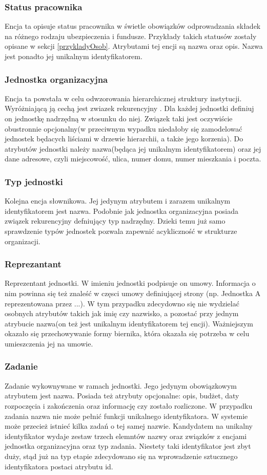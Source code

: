 \subsubsection{Status pracownika}
Encja ta opisuje status pracownika w świetle obowiązków odprowadzania składek na różnego rodzaju ubezpieczenia i fundusze. Przykłady takich statusów zostały opisane w sekcji \ref{przykladyOsob}. Atrybutami tej encji są nazwa oraz opis. Nazwa jest ponadto jej unikalnym identyfikatorem.

\subsubsection{Jednostka organizacyjna}
Encja ta powstała w celu odwzorowania hierarchicznej struktury instytucji. Wyróżniającą ją cechą jest zwiazek rekurencyjny . Dla każdej jednostki definiuj on jednostkę nadrzędną w stosunku do niej. Związek taki jest oczywiście obustronnie opcjonalny(w przeciwnym wypadku niedałoby się zamodelować jednostek będacych liściami w drzewie hierarchii, a także jego korzenia). Do atrybutów jednostki należy nazwa(będąca jej unikalnym identyfikatorem) oraz jej dane adresowe, czyli miejscowość, ulica, numer domu, numer mieszkania i poczta.

\subsubsection{Typ jednostki}
Kolejna encja słownikowa. Jej jedynym atrybutem i zarazem unikalnym identyfikatorem jest nazwa. Podobnie jak jednostka organizacyjna posiada związek rekurencyjny defniujący typ nadrzędny. Dzieki temu już samo sprawdzenie typów jednostek pozwala zapewnić acykliczność w strukturze organizacji.

\subsubsection{Reprezantant}
Reprezentant jednostki. W imieniu jednostki podpisuje on umowy. Informacja o nim powinna się też znaleść w częsci umowy definiującej strony (np. Jednostka A reprezentowana przez ...). W tym przypadku zdecydowno się nie wydzielać osobnych atrybutów takich jak imię czy nazwisko, a pozostać przy jednym atrybucie nazwa(on też jest unikalnym identyfikatorem tej encji). Ważniejszym okazało się przechowywanie formy biernika, która okazała się potrzeba w celu umieszczenia jej na umowie.

\subsubsection{Zadanie}
Zadanie wykownywane w ramach jednostki. Jego jedynym obowiązkowym atrybutem jest nazwa. Posiada też atrybuty opcjonalne: opis, budżet, daty rozpoczęcia i zakończenia oraz informację czy zostało rozliczone. W przypadku zadania nazwa nie może pełnić funkcji unikalnego identyfikatora. W systemie może przecież istnieć kilka zadań o tej samej nazwie. Kandydatem na unikalny identyfikator wydaje zestaw trzech elemntów nazwy oraz związków z encjami jednostka organizacyjna oraz typ zadania. Niestety taki identyfikator jest zbyt duży, stąd już na typ etapie zdecydowano się na wprowadzenie sztucznego identyfikatora postaci atrybutu id.

